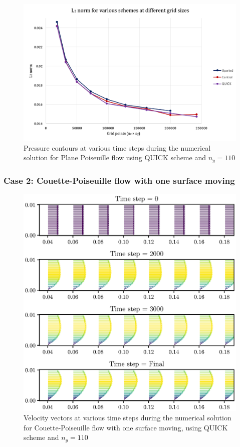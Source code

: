 \documentclass[12pt,a4paper,fleqn]{article}
\begin{document}
\begin{figure}[H]
  \centering
  \includegraphics[width=\textwidth]{l2_norm_grids.png}
  \caption{Pressure contours at various time steps during the numerical solution for Plane Poiseuille flow using QUICK scheme and $n_y = 110$}
\end{figure}

\subsubsection{Case 2: Couette-Poiseuille flow with one surface moving}
\begin{figure}[H]
  \centering
  \includegraphics[width=\linewidth]{navierFVD-velocityVectors-couette-poiseuille01}
  \caption{Velocity vectors at various time steps during the numerical solution for Couette-Poiseuille flow with one surface moving, using QUICK scheme and $n_y = 110$}
\end{figure}
\end{document}
